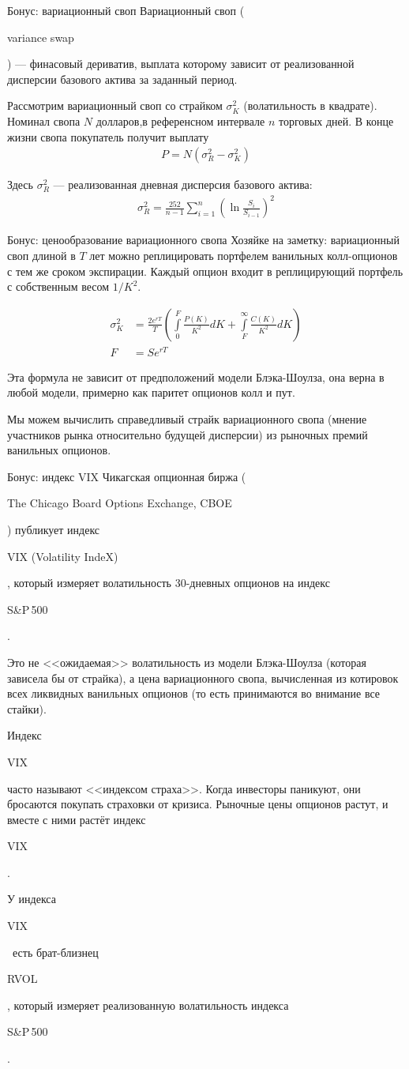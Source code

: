 \documentclass{beamer}
\newcommand{\en}[1]{\begin{otherlanguage}{english}#1\end{otherlanguage}}
\begin{document}
\begin{frame}{Бонус: вариационный своп}
\justify
\alert{Вариационный своп} (\en{variance swap}) --- финасовый дериватив, выплата которому зависит от реализованной дисперсии базового актива за заданный период.

\justify
Рассмотрим вариационный своп со страйком $\sigma_K^2$ (волатильность в квадрате). Номинал свопа $N$ долларов,в референсном интервале $n$ торговых дней. В конце жизни свопа покупатель получит выплату
\begin{align*}
P = N(\sigma_R^2 - \sigma_K^2)
\end{align*}

Здесь $\sigma_R^2$ --- реализованная дневная дисперсия базового актива:
\begin{align*}
\sigma_R^2 = \frac{252}{n-1}\sum\limits_{i=1}^{n}\left(\ln\frac{S_i}{S_{i-1}}\right)^2
\end{align*}
\end{frame}



\begin{frame}{Бонус: ценообразование вариационного свопа}
\justify
Хозяйке на заметку: вариационный своп длиной в $T$ лет можно реплицировать портфелем ванильных колл-опционов с тем же сроком экспирации. Каждый опцион входит в реплицирующий портфель с собственным весом $1/K^2$.

\begin{align*}
\sigma^2_K &= \frac{2e^{rT}}{T}\left(
\int\limits_{0}^{F}\frac{P(K)}{K^2}dK + 
\int\limits_{F}^{\infty}\frac{C(K)}{K^2}dK
\right) \\
F &= Se^{rT}
\end{align*}

\justify
Эта формула не зависит от предположений модели Блэка-Шоулза, она верна в любой модели, примерно как паритет опционов колл и пут.

\justify
Мы можем вычислить справедливый страйк вариационного свопа (мнение участников рынка относительно будущей дисперсии) из рыночных премий ванильных опционов.
\end{frame}



\begin{frame}{Бонус: индекс VIX}
\justify
Чикагская опционная биржа (\en{The Chicago Board Options Exchange, CBOE}) публикует индекс \en{VIX (Volatility IndeX)}, который измеряет волатильность 30-дневных опционов на индекс \en{S\&P\,500}.

\justify
Это не <<ожидаемая>> волатильность из модели Блэка-Шоулза (которая зависела бы от страйка), а цена вариационного свопа, вычисленная из котировок всех ликвидных ванильных опционов (то есть принимаются во внимание все стайки).

\justify
Индекс \en{VIX} часто называют <<индексом страха>>. Когда инвесторы паникуют, они бросаются покупать страховки от кризиса. Рыночные цены опционов растут, и вместе с ними растёт индекс \en{VIX}.

\justify
У индекса \en{VIX}\ есть брат-близнец \en{RVOL}, который измеряет реализованную волатильность индекса \en{S\&P\,500}.
\end{frame}
\end{document}

